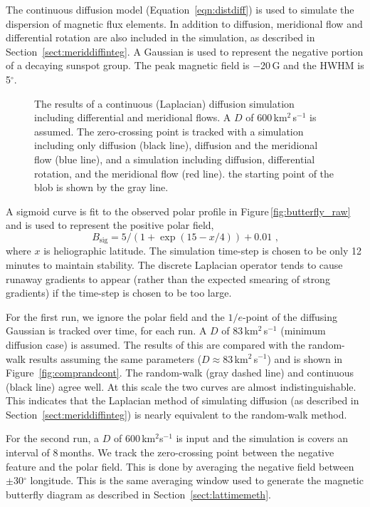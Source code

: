 The continuous diffusion model (Equation~\ref{eqn:distdiff}) is used to simulate the dispersion of magnetic flux elements. In addition to diffusion, meridional flow and differential rotation are also included in the simulation, as described in Section~\ref{sect:meriddiffinteg}. 
A Gaussian is used to represent the negative portion of a decaying sunspot group. The peak magnetic field is $-$20\,G and the HWHM is 5$^{\circ}$. 

\begin{figure}[!t]
\caption[Continuous diffusion and flow simulation.]{The results of a continuous (Laplacian) diffusion simulation including differential and meridional flows. A $D$ of 600\,km$^2$\,s$^{-1}$ is assumed. The zero-crossing point is tracked with a simulation including only diffusion (black line), diffusion and the meridional flow (blue line), and a simulation including diffusion, differential rotation, and the meridional flow (red line). the starting point of the blob is shown by the gray line.}
\label{fig:comprandcont2}
\end{figure}

A sigmoid curve is fit to the observed polar profile in Figure\,\ref{fig:butterfly_raw} and is used to represent the positive polar field,
\begin{equation}
B_{\mathrm{sig}} = 5/(1+\exp(15-x/4))+0.01 \mbox{ ,}
\end{equation}
where $x$ is heliographic latitude. The simulation time-step is chosen to be only 12\,minutes to maintain stability. The discrete Laplacian operator tends to cause runaway gradients to appear (rather than the expected smearing of strong gradients) if the time-step is chosen to be too large. 

For the first run, we ignore the polar field and the $1/e$-point of the diffusing Gaussian is tracked over time, for each run. A $D$ of 83\,km$^2$\,s$^{-1}$ (minimum diffusion case) is assumed. The results of this are compared with the random-walk results assuming the same parameters ($D\approx83$\,km$^2$\,s$^{-1}$) and is shown in Figure~\ref{fig:comprandcont}. The random-walk (gray dashed line) and continuous (black line) agree well. At this scale the two curves are almost indistinguishable. This indicates that the Laplacian method of simulating diffusion (as described in Section~\ref{sect:meriddiffinteg}) is nearly equivalent to the random-walk method.

For the second run, a $D$ of 600\,km$^2$s$^{-1}$ is input and the simulation is covers an interval of 8\,months. We track the zero-crossing point between the negative feature and the polar field. This is done by averaging the negative field between $\pm$30$^{\circ}$ longitude. This is the same averaging window used to generate the magnetic butterfly diagram as described in Section~\ref{sect:lattimemeth}.

